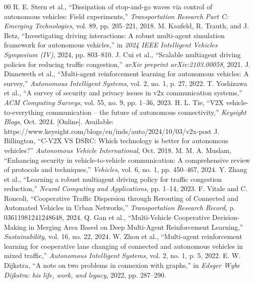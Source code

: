 \documentclass[conference]{IEEEtran}
\begin{document}
\begin{thebibliography}{00}
 R. E. Stern et al., ``Dissipation of stop-and-go waves via control of autonomous vehicles: Field experiments,'' \textit{Transportation Research Part C: Emerging Technologies}, vol. 89, pp. 205--221, 2018.
 M. Kaufeld, R. Trauth, and J. Betz, ``Investigating driving interactions: A robust multi-agent simulation framework for autonomous vehicles,'' in \textit{2024 IEEE Intelligent Vehicles Symposium (IV)}, 2024, pp. 803--810.
 J. Cui et al., ``Scalable multiagent driving policies for reducing traffic congestion,'' \textit{arXiv preprint arXiv:2103.00058}, 2021.
 J. Dinneweth et al., ``Multi-agent reinforcement learning for autonomous vehicles: A survey,'' \textit{Autonomous Intelligent Systems}, vol. 2, no. 1, p. 27, 2022.
 T. Yoshizawa et al., ``A survey of security and privacy issues in v2x communication systems,'' \textit{ACM Computing Surveys}, vol. 55, no. 9, pp. 1--36, 2023.
 H. L. Tie, ``V2X vehicle-to-everything communication – the future of autonomous connectivity,'' \textit{Keysight Blogs}, Oct. 2024. [Online]. Available: https://www.keysight.com/blogs/en/inds/auto/2024/10/03/v2x-post
 J. Billington, ``C-V2X VS DSRC: Which technology is better for autonomous vehicles?'' \textit{Autonomous Vehicle International}, Oct. 2018.
 M. M. A. Muslam, ``Enhancing security in vehicle-to-vehicle communication: A comprehensive review of protocols and techniques,'' \textit{Vehicles}, vol. 6, no. 1, pp. 450--467, 2024.
 Y. Zhang et al., ``Learning a robust multiagent driving policy for traffic congestion reduction,'' \textit{Neural Computing and Applications}, pp. 1--14, 2023.
 F. Vitale and C. Roncoli, ``Cooperative Traffic Dispersion through Rerouting of Connected and Automated Vehicles in Urban Networks,'' \textit{Transportation Research Record}, p. 03611981241248648, 2024.
 Q. Gan et al., ``Multi-Vehicle Cooperative Decision-Making in Merging Area Based on Deep Multi-Agent Reinforcement Learning,'' \textit{Sustainability}, vol. 16, no. 22, 2024.
 W. Zhou et al., ``Multi-agent reinforcement learning for cooperative lane changing of connected and autonomous vehicles in mixed traffic,'' \textit{Autonomous Intelligent Systems}, vol. 2, no. 1, p. 5, 2022.
 E. W. Dijkstra, ``A note on two problems in connexion with graphs,'' in \textit{Edsger Wybe Dijkstra: his life, work, and legacy}, 2022, pp. 287--290.

\end{thebibliography}
\end{document}

